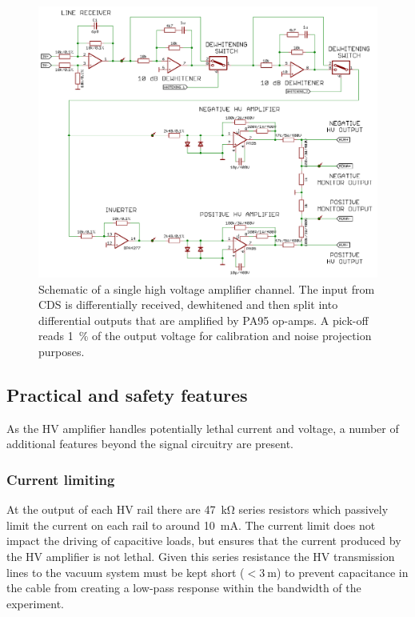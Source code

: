 \begin{figure}[htp]
  \centering
  \includegraphics[width=\columnwidth]{graphics/60-hv-amp-signal-path.pdf}
  \caption[High voltage amplifier signal schematic]{\label{fig:hv-amp-signal-path}Schematic of a single high voltage amplifier channel. The input from \gls{CDS} is differentially received, dewhitened and then split into differential outputs that are amplified by PA95 op-amps. A pick-off reads \SI{1}{\percent} of the output voltage for calibration and noise projection purposes.}
\end{figure}

\subsection{Practical and safety features}
As the \gls{HV} amplifier handles potentially lethal current and voltage, a number of additional features beyond the signal circuitry are present.

\subsubsection{\label{sec:hv-amp-current-limit}Current limiting}
At the output of each \gls{HV} rail there are \SI{47}{\kilo\ohm} series resistors which passively limit the current on each rail to around \SI{10}{\milli\ampere}. The current limit does not impact the driving of capacitive loads, but ensures that the current produced by the \gls{HV} amplifier is not lethal. Given this series resistance the \gls{HV} transmission lines to the vacuum system must be kept short ($<\SI{3}{\meter}$) to prevent capacitance in the cable from creating a low-pass response within the bandwidth of the experiment.

